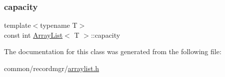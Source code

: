 \subsubsection{\texorpdfstring{capacity}{capacity}}
{\footnotesize\ttfamily template$<$typename T$>$ \\
const int \hyperlink{classArrayList}{Array\+List}$<$ T $>$\+::capacity}



The documentation for this class was generated from the following file\+:\begin{DoxyCompactItemize}
\item 
common/recordmgr/\hyperlink{arraylist_8h}{arraylist.\+h}\end{DoxyCompactItemize}

